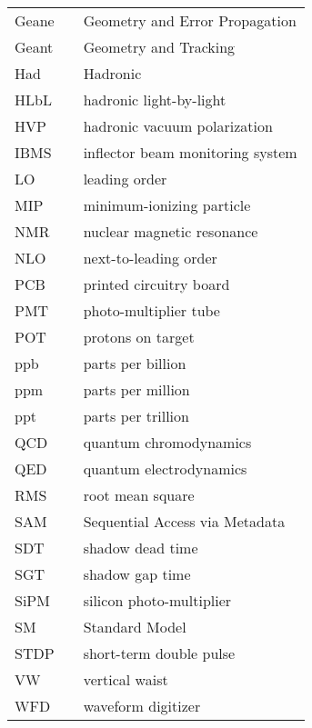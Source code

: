 {\begin{center}
\begin{longtable}{lll}
    Geane & \dotfill & Geometry and Error Propagation \\
    Geant & \dotfill & Geometry and Tracking \\
    Had & \dotfill & Hadronic \\
    HLbL & \dotfill & hadronic light-by-light \\
    HVP & \dotfill & hadronic vacuum polarization \\
    IBMS & \dotfill & inflector beam monitoring system \\
    LO & \dotfill & leading order \\
    MIP & \dotfill & minimum-ionizing particle \\
    NMR & \dotfill & nuclear magnetic resonance \\
    NLO & \dotfill & next-to-leading order \\
    PCB & \dotfill & printed circuitry board \\
    PMT  & \dotfill & photo-multiplier tube \\
    POT & \dotfill & protons on target \\
    ppb & \dotfill & parts per billion \\
    ppm & \dotfill & parts per million \\
    ppt & \dotfill & parts per trillion \\
    QCD & \dotfill & quantum chromodynamics \\
    QED & \dotfill & quantum electrodynamics \\
    RMS & \dotfill & root mean square \\
    SAM & \dotfill & Sequential Access via Metadata \\
    SDT & \dotfill & shadow dead time \\
    SGT & \dotfill & shadow gap time \\
    SiPM & \dotfill & silicon photo-multiplier \\
    SM & \dotfill & Standard Model \\
    STDP & \dotfill & short-term double pulse \\
    VW & \dotfill & vertical waist \\
    WFD & \dotfill & waveform digitizer \\
  \end{longtable}
\end{center}
\cleardoublepage

} %


\newpage
\endofprelim
